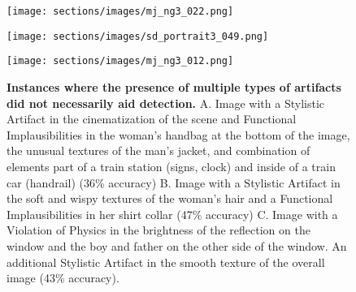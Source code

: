 \begin{figure}[htb]
\centering
\captionsetup{justification=raggedright, singlelinecheck=false, skip=2pt, font=small}

\begin{minipage}[t]{0.32\textwidth}
    \centering
    \subcaption{}
    \texttt{[image: sections/images/mj\_ng3\_022.png]}
\end{minipage}%
\hfill%
\begin{minipage}[t]{0.32\textwidth}
    \centering
    \subcaption{}
    \texttt{[image: sections/images/sd\_portrait3\_049.png]}
\end{minipage}%
\hfill%
\begin{minipage}[t]{0.32\textwidth}
    \centering
    \subcaption{}
    \texttt{[image: sections/images/mj\_ng3\_012.png]}
\end{minipage}
\caption{\textbf{Instances where the presence of multiple types of artifacts did not necessarily aid detection.} A. Image with a Stylistic Artifact in the cinematization of the scene and Functional Implausibilities in the woman's handbag at the bottom of the image, the unusual textures of the man's jacket, and combination of elements part of a train station (signs, clock) and inside of a train car (handrail) (36\% accuracy) B. Image with a Stylistic Artifact in the soft and wispy textures of the woman's hair and a Functional Implausibilities in her shirt collar (47\% accuracy) C. Image with a Violation of Physics in the brightness of the reflection on the window and the boy and father on the other side of the window. An additional Stylistic Artifact in the smooth texture of the overall image (43\% accuracy).}
\label{fig:artifact_examples}
\end{figure}




